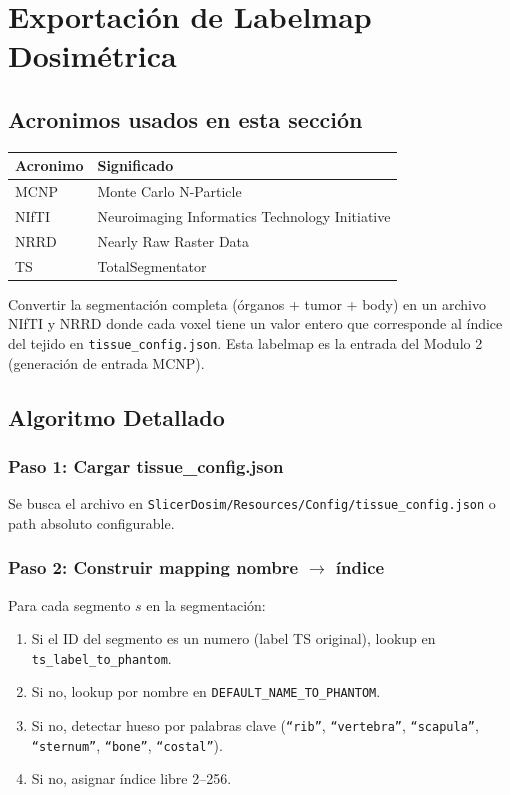 \documentclass[12pt,a4paper]{article}
\begin{document}
\section{Exportación de Labelmap Dosimétrica}
\label{sec:labelmap}

\subsection*{Acronimos usados en esta sección}
\begin{tabular}{ll}
\toprule
\textbf{Acronimo} & \textbf{Significado} \\
\midrule
MCNP & Monte Carlo N-Particle \\
NIfTI & Neuroimaging Informatics Technology Initiative \\
NRRD & Nearly Raw Raster Data \\
TS & TotalSegmentator \\
\bottomrule
\end{tabular}

Convertir la segmentación completa (órganos + tumor + body) en un archivo NIfTI y NRRD donde
cada voxel tiene un valor entero que corresponde al índice del tejido en
\texttt{tissue\_config.json}. Esta labelmap es la entrada del Modulo 2 (generación de entrada
MCNP).

\subsection{Algoritmo Detallado}

\subsubsection{Paso 1: Cargar tissue\_config.json}

Se busca el archivo en \texttt{SlicerDosim/Resources/Config/tissue\_config.json}
o path absoluto configurable.

\subsubsection{Paso 2: Construir mapping nombre \texorpdfstring{$\to$}{a} índice}

Para cada segmento $s$ en la segmentación:

\begin{enumerate}
    \item Si el ID del segmento es un numero (label TS original), lookup en
          \texttt{ts\_label\_to\_phantom}.
    \item Si no, lookup por nombre en \texttt{DEFAULT\_NAME\_TO\_PHANTOM}.
    \item Si no, detectar hueso por palabras clave (\texttt{``rib''}, \texttt{``vertebra''},
          \texttt{``scapula''}, \texttt{``sternum''}, \texttt{``bone''}, \texttt{``costal''}).
    \item Si no, asignar índice libre 2--256.
\end{enumerate}
\end{document}

